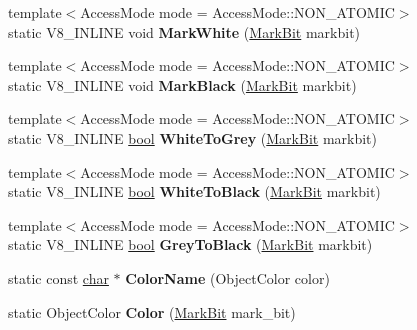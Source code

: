 \begin{DoxyCompactItemize}
\item 
\mbox{\label{classv8_1_1internal_1_1Marking_afbd0b9359dfb1c5645cbc58b6116db1d}} 
{\footnotesize template$<$Access\+Mode mode = Access\+Mode\+::\+N\+O\+N\+\_\+\+A\+T\+O\+M\+IC$>$ }\\static V8\+\_\+\+I\+N\+L\+I\+NE void {\bfseries Mark\+White} (\mbox{\hyperlink{classv8_1_1internal_1_1MarkBit}{Mark\+Bit}} markbit)
\item 
\mbox{\label{classv8_1_1internal_1_1Marking_a583087195849073b10faa70fe776bf6b}} 
{\footnotesize template$<$Access\+Mode mode = Access\+Mode\+::\+N\+O\+N\+\_\+\+A\+T\+O\+M\+IC$>$ }\\static V8\+\_\+\+I\+N\+L\+I\+NE void {\bfseries Mark\+Black} (\mbox{\hyperlink{classv8_1_1internal_1_1MarkBit}{Mark\+Bit}} markbit)
\item 
\mbox{\label{classv8_1_1internal_1_1Marking_aba5e5ce9952925314d677050dfc22736}} 
{\footnotesize template$<$Access\+Mode mode = Access\+Mode\+::\+N\+O\+N\+\_\+\+A\+T\+O\+M\+IC$>$ }\\static V8\+\_\+\+I\+N\+L\+I\+NE \mbox{\hyperlink{classbool}{bool}} {\bfseries White\+To\+Grey} (\mbox{\hyperlink{classv8_1_1internal_1_1MarkBit}{Mark\+Bit}} markbit)
\item 
\mbox{\label{classv8_1_1internal_1_1Marking_accafb14036e86281073416ea6f5615f3}} 
{\footnotesize template$<$Access\+Mode mode = Access\+Mode\+::\+N\+O\+N\+\_\+\+A\+T\+O\+M\+IC$>$ }\\static V8\+\_\+\+I\+N\+L\+I\+NE \mbox{\hyperlink{classbool}{bool}} {\bfseries White\+To\+Black} (\mbox{\hyperlink{classv8_1_1internal_1_1MarkBit}{Mark\+Bit}} markbit)
\item 
\mbox{\label{classv8_1_1internal_1_1Marking_a041f8550c7a065473094a8028bfc0db1}} 
{\footnotesize template$<$Access\+Mode mode = Access\+Mode\+::\+N\+O\+N\+\_\+\+A\+T\+O\+M\+IC$>$ }\\static V8\+\_\+\+I\+N\+L\+I\+NE \mbox{\hyperlink{classbool}{bool}} {\bfseries Grey\+To\+Black} (\mbox{\hyperlink{classv8_1_1internal_1_1MarkBit}{Mark\+Bit}} markbit)
\item 
\mbox{\label{classv8_1_1internal_1_1Marking_a794f5a72f6b93a92e5adfa9be0bc03bc}} 
static const \mbox{\hyperlink{classchar}{char}} $\ast$ {\bfseries Color\+Name} (Object\+Color color)
\item 
\mbox{\label{classv8_1_1internal_1_1Marking_a09c077addf84018f1047833571d24435}} 
static Object\+Color {\bfseries Color} (\mbox{\hyperlink{classv8_1_1internal_1_1MarkBit}{Mark\+Bit}} mark\+\_\+bit)
\end{DoxyCompactItemize}
